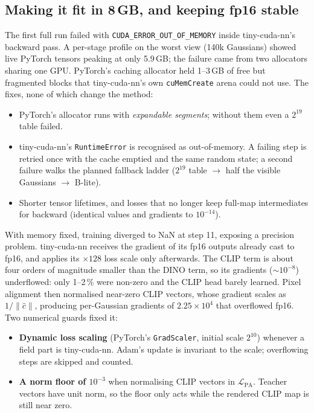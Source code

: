 \documentclass[11pt,a4paper]{article}
\newcommand{\code}[1]{\texttt{#1}}
\begin{document}
\subsection{\texorpdfstring{Making it fit in 8\,GB, and keeping fp16 stable}{Making it fit in 8 GB, and keeping fp16 stable}}
\label{sec:engineering}
The first full run failed with \code{CUDA\_ERROR\_OUT\_OF\_MEMORY} inside tiny-cuda-nn's backward pass. A per-stage
profile on the worst view (140k Gaussians) showed live PyTorch tensors peaking at only 5.9\,GB; the failure came
from two allocators sharing one GPU. PyTorch's caching allocator held 1--3\,GB of free but fragmented blocks that
tiny-cuda-nn's own \code{cuMemCreate} arena could not use. The fixes, none of which change the method:
\begin{itemize}
  \item PyTorch's allocator runs with \emph{expandable segments}; without them even a $2^{19}$ table failed.
  \item tiny-cuda-nn's \code{RuntimeError} is recognised as out-of-memory. A failing step is retried once with the
        cache emptied and the same random state; a second failure walks the planned fallback ladder
        ($2^{19}$ table $\rightarrow$ half the visible Gaussians $\rightarrow$ B-lite).
  \item Shorter tensor lifetimes, and losses that no longer keep full-map intermediates for backward (identical
        values and gradients to $10^{-14}$).
\end{itemize}

With memory fixed, training diverged to NaN at step 11, exposing a precision problem. tiny-cuda-nn receives the
gradient of its fp16 outputs already cast to fp16, and applies its $\times128$ loss scale only afterwards. The CLIP
term is about four orders of magnitude smaller than the DINO term, so its gradients ($\sim10^{-8}$) underflowed:
only 1--2\,\% were non-zero and the CLIP head barely learned. Pixel alignment then normalised near-zero CLIP
vectors, whose gradient scales as $1/\lVert\hat c\rVert$, producing per-Gaussian gradients of $2.25\times10^4$
that overflowed fp16. Two numerical guards fixed it:
\begin{itemize}
  \item \textbf{Dynamic loss scaling} (PyTorch's \code{GradScaler}, initial scale $2^{10}$) whenever a field part
        is tiny-cuda-nn. Adam's update is invariant to the scale; overflowing steps are skipped and counted.
  \item \textbf{A norm floor of $10^{-3}$} when normalising CLIP vectors in $\mathcal{L}_{\mathrm{PA}}$. Teacher
        vectors have unit norm, so the floor only acts while the rendered CLIP map is still near zero.
\end{itemize}
\end{document}
